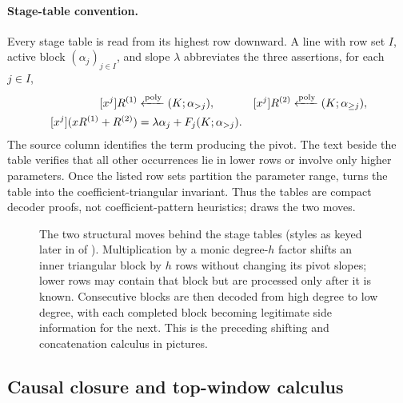 \paragraph{Stage-table convention.}
Every stage table is read from its highest row downward.  A line with row set
$I$, active block $(\alpha_j)_{j\in I}$, and slope $\lambda$ abbreviates the
three assertions, for each $j\in I$,
\[
\begin{aligned}
 [x^j]R^{(1)}&\polyfrom(K;\alpha_{>j}),&
 [x^j]R^{(2)}&\polyfrom(K;\alpha_{\ge j}),\\
 [x^j](xR^{(1)}+R^{(2)})
   &=\lambda\alpha_j+F_j(K;\alpha_{>j}).
\end{aligned}
\]
The source column identifies the term producing the pivot.  The text beside
the table verifies that all other occurrences lie in lower rows or involve
only higher parameters.  Once the listed row sets partition the parameter
range,  turns the table into the
coefficient-triangular invariant.  Thus the tables are compact decoder
proofs, not coefficient-pattern heuristics; 
draws the two moves.

\begin{figure}[H]
  \centering
  \resizebox{\textwidth}{!}{}
  \caption{The two structural moves behind the stage tables (styles as
  keyed later in  of ).
  Multiplication by a monic degree-$h$ factor shifts an inner triangular
  block by $h$ rows without changing its pivot slopes; lower rows may contain
  that block but are processed only after it is known.  Consecutive blocks
  are then decoded from high degree to low degree, with each completed block
  becoming legitimate side information for the next.  This is the preceding
  shifting and concatenation calculus in pictures.}
  \label{fig:triangular-blocks}
\end{figure}


\subsection{Causal closure and top-window calculus}

